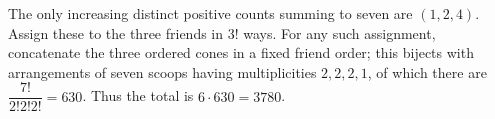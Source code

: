 The only increasing distinct positive counts summing to seven are $(1,2,4)$. Assign these to the three friends in $3!$ ways. For any such assignment, concatenate the three ordered cones in a fixed friend order; this bijects with arrangements of seven scoops having multiplicities $2,2,2,1$, of which there are $\dfrac{7!}{2!2!2!}=630$. Thus the total is $6\cdot630=\boxed{3780}$.
